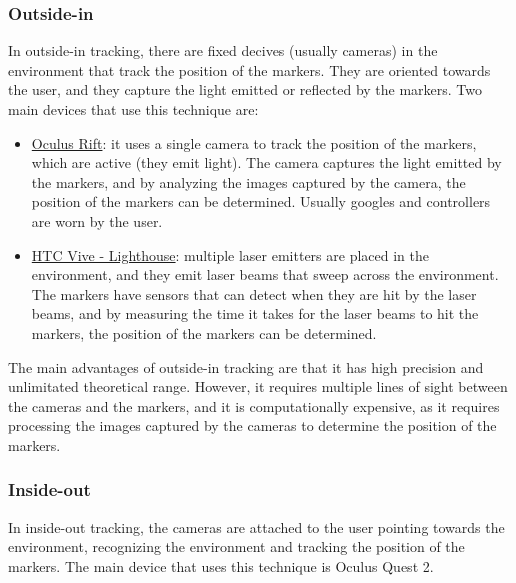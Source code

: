 \subsubsection{Outside-in}
In outside-in tracking, there are fixed decives (usually cameras) in the environment that track the position of the markers. They are oriented towards the user, and they capture the light emitted or reflected by the markers. Two main devices that use this technique are:
\begin{itemize}
    \item \ul{Oculus Rift}: it uses a single camera to track the position of the markers, which are active (they emit light). The camera captures the light emitted by the markers, and by analyzing the images captured by the camera, the position of the markers can be determined. Usually googles and controllers are worn by the user.
    \item \ul{HTC Vive - Lighthouse}: multiple laser emitters are placed in the environment, and they emit laser beams that sweep across the environment. The markers have sensors that can detect when they are hit by the laser beams, and by measuring the time it takes for the laser beams to hit the markers, the position of the markers can be determined.
\end{itemize}

The main advantages of outside-in tracking are that it has high precision and unlimitated theoretical range. However, it requires multiple lines of sight between the cameras and the markers, and it is computationally expensive, as it requires processing the images captured by the cameras to determine the position of the markers.

\subsubsection{Inside-out}

In inside-out tracking, the cameras are attached to the user pointing towards the environment, recognizing the environment and tracking the position of the markers. The main device that uses this technique is Oculus Quest 2.